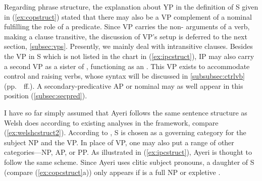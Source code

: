 Regarding phrase structure, the explanation about YP in the definition of
S given in (\ref{ex:copstruct}) stated that
there may also be a VP complement of a nominal
fulfilling the role of a predicate. Since VP
carries the non-\Subj{} arguments of a verb, making a clause
transitive, the discussion of VP's setup is deferred to the next section, \ref{subsec:vps}.
Presently, we mainly deal with intransitive clauses. Besides the VP in S which is not listed in
the chart in (\ref{ex:ipcstruct}), IP may also carry a second VP as a sister of , functioning as an
\XCompl{}. This VP exists to accommodate control and
raising verbs, whose syntax will be discussed in
\autoref{subsubsec:ctrlvb} (pp.~\pageref{subsubsec:ctrlvb}~ff.). A
secondary-predicative AP or nominal may as
well appear in this position (\autoref{subsec:secpred}).

I have so far simply assumed that Ayeri follows the same sentence structure as
Welsh does according to existing analyses in the
\Lfg{} framework, compare
(\ref{ex:welshcstruct2}). According to \citet[130]{bresnan2016}, S is chosen as a governing category for the
subject NP and the VP. In place of VP, one may also
put a range of other categories---NP,
AP, or PP. As illustrated in (\ref{ex:ipcstruct}), Ayeri is thought to follow the
same scheme. Since Ayeri uses clitic subject pronouns, a \Subj{} daughter of
S (compare (\ref{ex:copcstruct}a)) only appears if \Subj{} is a full
NP or expletive .

